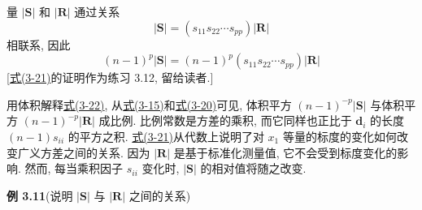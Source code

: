 
量 $|\mathbf{S}|$ 和 $|\mathbf{R}|$ 通过关系
\label{eq:3-21}
\begin{equation}
|\mathbf{S}|=(s_{11}s_{22}\cdots s_{pp})|\mathbf{R}| \tag{3-21}
\end{equation}
相联系, 因此
\label{eq:3-22}
\begin{equation}
(n-1)^{p}|\mathbf{S}|=(n-1)^{p}(s_{11}s_{22}\cdots s_{pp})|\mathbf{R}| \tag{3-22}
\end{equation}
[\hyperref[eq:3-21]{式(3-21)}的证明作为练习 3.12, 留给读者.]

用体积解释\hyperref[eq:3-22]{式(3-22)}, 从\hyperref[eq:3-15]{式(3-15)}和\hyperref[eq:3-20]{式(3-20)}可见, 体积平方 $(n-1)^{-p}|\mathbf{S}|$ 与体积平方 $(n-1)^{-p}|\mathbf{R}|$ 成比例. 比例常数是方差的乘积, 而它同样也正比于 $\mathbf{d}_{i}$ 的长度 $(n-1)s_{ii}$ 的平方之积. \hyperref[eq:3-21]{式(3-21)}从代数上说明了对 $x_{1}$ 等量的标度的变化如何改变广义方差之间的关系. 因为 $|\mathbf{R}|$ 是基于标准化测量值, 它不会受到标度变化的影响. 然而, 每当乘积因子 $s_{ii}$ 变化时, $|\mathbf{S}|$ 的相对值将随之改变.

\noindent\textbf{例 3.11}\quad (说明 $|\mathbf{S}|$ 与 $|\mathbf{R}|$ 之间的关系)

